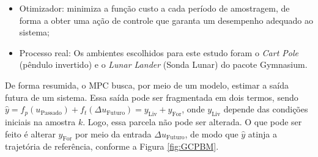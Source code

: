 \documentclass[12pt,           %
a4paper,                       %
openany,                       %
oneside,                       %
chapter=TITLE,                 %
english,                       %
spanish,                       %
brazil,                        %
sumario=tradicional]{abntex2}  %
\begin{document}
\begin{OnehalfSpace}
\begin{itemize}
\item Otimizador: minimiza a função custo a cada período de amostragem, de forma a obter uma ação de controle que garanta um desempenho adequado ao sistema;

\item Processo real: Os ambientes escolhidos para este estudo foram o \textit{Cart Pole} (pêndulo invertido) e o \textit{Lunar Lander} (Sonda Lunar) do pacote Gymnasium.
\end{itemize}

De forma resumida, o MPC busca, por meio de um modelo, estimar a saída futura de um sistema. Essa saída pode ser fragmentada em dois termos, sendo $\hat{y} = f_p(u_{\text{Passado}}) + f_t(\Delta u_{\text{Futuro}}) = y_{\text{Liv}} + y_{\text{For}}$, onde $y_{\text{Liv}}$ depende das condições iniciais na amostra $k$. Logo, essa parcela não pode ser alterada. O que pode ser feito é alterar $y_{\text{For}}$ por meio da entrada $\Delta u_{\text{Futuro}}$, de modo que $\hat{y}$ atinja a trajetória de referência, conforme a Figura \ref{fig:GCPBM}.


\end{OnehalfSpace}
\end{document}
